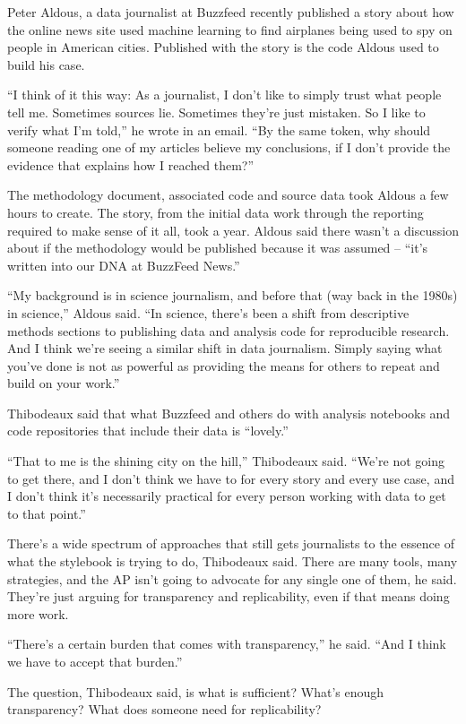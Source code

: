\documentclass[]{book}
\begin{document}
Peter Aldous, a data journalist at Buzzfeed recently published a story about how the online news site used machine learning to find airplanes being used to spy on people in American cities. Published with the story is the code Aldous used to build his case.

``I think of it this way: As a journalist, I don't like to simply trust what people tell me. Sometimes sources lie. Sometimes they're just mistaken. So I like to verify what I'm told,'' he wrote in an email. ``By the same token, why should someone reading one of my articles believe my conclusions, if I don't provide the evidence that explains how I reached them?''

The methodology document, associated code and source data took Aldous a few hours to create. The story, from the initial data work through the reporting required to make sense of it all, took a year. Aldous said there wasn't a discussion about if the methodology would be published because it was assumed -- ``it's written into our DNA at BuzzFeed News.''

``My background is in science journalism, and before that (way back in the 1980s) in science,'' Aldous said. ``In science, there's been a shift from descriptive methods sections to publishing data and analysis code for reproducible research. And I think we're seeing a similar shift in data journalism. Simply saying what you've done is not as powerful as providing the means for others to repeat and build on your work.''

Thibodeaux said that what Buzzfeed and others do with analysis notebooks and code repositories that include their data is ``lovely.''

``That to me is the shining city on the hill,'' Thibodeaux said. ``We're not going to get there, and I don't think we have to for every story and every use case, and I don't think it's necessarily practical for every person working with data to get to that point.''

There's a wide spectrum of approaches that still gets journalists to the essence of what the stylebook is trying to do, Thibodeaux said. There are many tools, many strategies, and the AP isn't going to advocate for any single one of them, he said. They're just arguing for transparency and replicability, even if that means doing more work.

``There's a certain burden that comes with transparency,'' he said. ``And I think we have to accept that burden.''

The question, Thibodeaux said, is what is sufficient? What's enough transparency? What does someone need for replicability?
\end{document}
